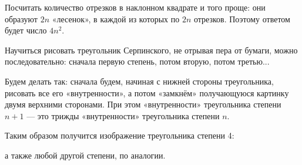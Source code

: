 \begin{itemize}
\vspace{-0.4cm}
Посчитать количество отрезков в наклонном квадрате и того проще: они образуют $2n$ «лесенок», в каждой из которых по $2n$ отрезков. Поэтому ответом будет число $4n^2$.

\itC Научиться рисовать треугольник Серпинского, не отрывая пера от бумаги, можно последовательно: сначала первую степень, потом вторую, потом третью...

Будем делать так: сначала будем, начиная с нижней стороны треугольника, рисовать все его «внутренности», а потом «замкнём» \linebreak получающуюся картинку двумя верхними сторонами. При этом \linebreak «внутренности» треугольника степени $n+1$ — это трижды «внутренности» треугольника степени $n$.

Таким образом получится изображение треугольника степени 4:

\begin{center}  \end{center}

а также любой другой степени, по аналогии.
\end{itemize}